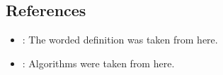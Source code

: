 \subsection{References}
\begin{itemize}
    \item \href{https://en.wikipedia.org/wiki/Heap_(data_structure)}{}: The worded definition was taken from here.
    \item \href{https://en.wikipedia.org/wiki/Binary_heap}{}: Algorithms were taken from here.
\end{itemize}

